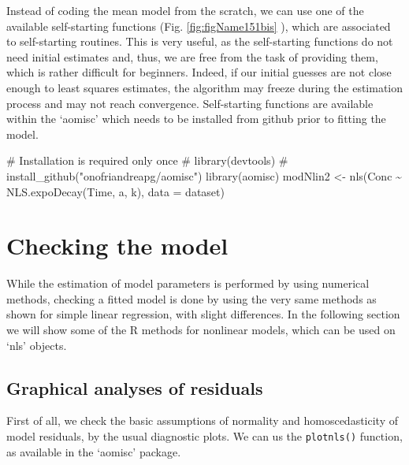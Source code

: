 \documentclass[a4paper,12pt,oneside]{book}
\newenvironment{Shaded}{\begin{snugshade}}{\end{snugshade}}
\newcommand{\SpecialCharTok}[1]{#1}
\newcommand{\CommentTok}[1]{#1}
\newcommand{\OtherTok}[1]{#1}
\newcommand{\FunctionTok}[1]{#1}
\newcommand{\AttributeTok}[1]{#1}
\newcommand{\NormalTok}[1]{#1}
\begin{document}
Instead of coding the mean model from the scratch, we can use one of the available self-starting functions (Fig. \ref{fig:figName151bis} ), which are associated to self-starting routines. This is very useful, as the self-starting functions do not need initial estimates and, thus, we are free from the task of providing them, which is rather difficult for beginners. Indeed, if our initial guesses are not close enough to least squares estimates, the algorithm may freeze during the estimation process and may not reach convergence. Self-starting functions are available within the `aomisc' which needs to be installed from github prior to fitting the model.

\begin{Shaded}
\begin{Highlighting}[]
\CommentTok{\# Installation is required only once}
\CommentTok{\# library(devtools)}
\CommentTok{\# install\_github("onofriandreapg/aomisc")}
\FunctionTok{library}\NormalTok{(aomisc)}
\NormalTok{modNlin2 }\OtherTok{\textless{}{-}} \FunctionTok{nls}\NormalTok{(Conc }\SpecialCharTok{\textasciitilde{}} \FunctionTok{NLS.expoDecay}\NormalTok{(Time, a, k),}
               \AttributeTok{data =}\NormalTok{ dataset)}
\end{Highlighting}
\end{Shaded}

\hypertarget{checking-the-model}{%
\section{Checking the model}\label{checking-the-model}}

While the estimation of model parameters is performed by using numerical methods, checking a fitted model is done by using the very same methods as shown for simple linear regression, with slight differences. In the following section we will show some of the R methods for nonlinear models, which can be used on `nls' objects.

\hypertarget{graphical-analyses-of-residuals}{%
\subsection{Graphical analyses of residuals}\label{graphical-analyses-of-residuals}}

First of all, we check the basic assumptions of normality and homoscedasticity of model residuals, by the usual diagnostic plots. We can us the \texttt{plotnls()} function, as available in the `aomisc' package.
\end{document}
